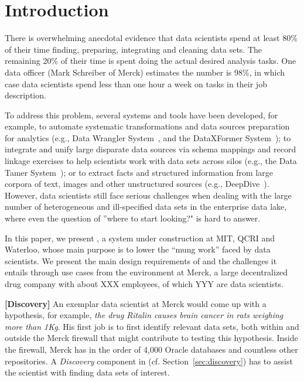 \section{Introduction}
\label{introduction}

There is overwhelming anecdotal evidence that data scientists spend at least
80\% of their time finding, preparing, integrating and cleaning data sets.
The remaining 20\% of their time is spent doing the actual desired analysis
tasks.
One data officer (Mark Schreiber
of Merck) estimates the number is 98\%, in which case data
scientists spend less than one hour a week on tasks in their job description.


To address this problem, several systems and tools have been developed, for example, 
to automate systematic transformations and data sources preparation for analytics (e.g., Data Wrangler System~\cite{2011-wrangler}, and the DataXFormer System~\cite{DBLP:conf/icde/AbedjanMIOPS16}); 
to integrate and unify large disparate data sources via schema mappings and record linkage exercises to help scientists work with data sets across silos (e.g., the Data Tamer System~\cite{DBLP:conf/cidr/StonebrakerBIBCZPX13}); 
or to extract facts and structured information from large corpora of text, images and other unstructured sources (e.g., DeepDive~\cite{DBLP:journals/pvldb/ShinWWSZR15}). 
However, data scientists still face serious challenges when dealing with the large number of heterogeneous and ill-specified data sets in the enterprise data lake, where even the question of ''where to start looking?" is hard to answer. 

In this paper, we present 
\dcv, a system under construction
at MIT, QCRI and Waterloo, whose main purpose  is to lower the ``mung work''  faced by
data scientists.  We present the main  design requirements of \dcv and the challenges it entails through use cases from the environment at Merck,  a large decentralized drug company with about XXX employees, of which YYY are data scientists.


{\bf[Discovery]} An exemplar data scientist at Merck would come up with a hypothesis, for example, {\it the drug Ritalin causes brain cancer in rats weighing more than 1Kg}.  His first job is to first identify relevant data sets, both within and outside the Merck firewall that might contribute to testing this hypothesis.  Inside the firewall, Merck has in the order of  4,000 Oracle databases and countless other repositories.  A {\it Discovery} component in \dcv (cf. Section~\ref{sec:discovery}) has to assist the scientist with finding data sets of interest.

